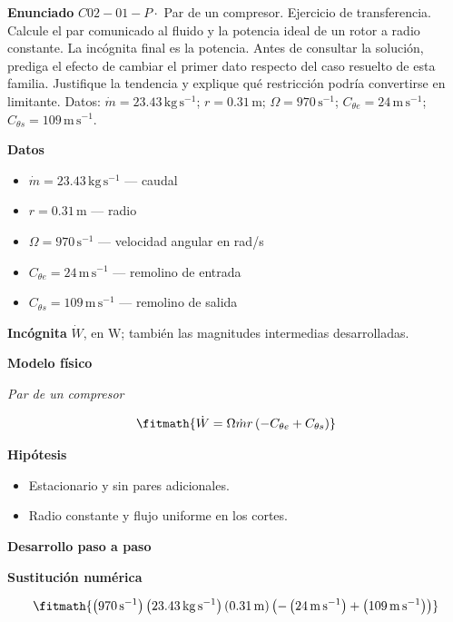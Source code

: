 \documentclass[10pt,openany]{book}
\begin{document}
\noindent\textbf{Enunciado}
\(C02-01-P \cdot\) Par de un compresor. Ejercicio de transferencia. Calcule el par comunicado al fluido y la potencia ideal de un rotor a radio constante. La incógnita final es la potencia. Antes de consultar la solución, prediga el efecto de cambiar el primer dato respecto del caso resuelto de esta familia. Justifique la tendencia y explique qué restricción podría convertirse en limitante. Datos: \(\dot m=23.43\, \mathrm{kg}\,\mathrm{s}^{-1}\); \(r=0.31\, \mathrm{m}\); \(\Omega=970\, \mathrm{s}^{-1}\); \(C_{\theta e}=24\, \mathrm{m}\,\mathrm{s}^{-1}\); \(C_{\theta s}=109\, \mathrm{m}\,\mathrm{s}^{-1}\).

\noindent\textbf{Datos}
\begin{itemize}
\item $\dot m = 23.43\,\mathrm{kg}\,\mathrm{s}^{-1}$ — caudal
\item $r = 0.31\,\mathrm{m}$ — radio
\item $\Omega = 970\,\mathrm{s}^{-1}$ — velocidad angular en rad/s
\item $C_{\theta e} = 24\,\mathrm{m}\,\mathrm{s}^{-1}$ — remolino de entrada
\item $C_{\theta s} = 109\,\mathrm{m}\,\mathrm{s}^{-1}$ — remolino de salida
\end{itemize}

\noindent\textbf{Incógnita}
$\dot{W}$, en $\mathrm{W}$; también las magnitudes intermedias desarrolladas.

\noindent\textbf{Modelo físico}

\noindent\textit{Par de un compresor}

\[
\fitmath{\dot{W}=\Omega \dot m r \left(- C_{\theta e} + C_{\theta s}\right)}
\]

\noindent\textbf{Hipótesis}
\begin{itemize}
\item Estacionario y sin pares adicionales.
\item Radio constante y flujo uniforme en los cortes.
\end{itemize}

\noindent\textbf{Desarrollo paso a paso}



\noindent\textbf{Sustitución numérica}

\[
\fitmath{\left(970\,\mathrm{s}^{-1}\right) \left(23.43\,\mathrm{kg}\,\mathrm{s}^{-1}\right) \left(0.31\,\mathrm{m}\right) \left(- \left(24\,\mathrm{m}\,\mathrm{s}^{-1}\right) + \left(109\,\mathrm{m}\,\mathrm{s}^{-1}\right)\right)}
\]
\end{document}

